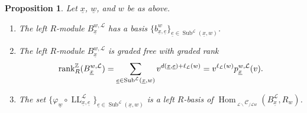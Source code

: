 \documentclass{amsart}
\newcommand{\Z}{\mathbb{Z}}
\newcommand{\scrL}{\mathcal{L}}
\DeclareMathOperator{\Hom}{Hom}
\DeclareMathOperator{\LL}{LL}
\newcommand{\Cmon}[2]{\:_{#1 \backslash} \mathcal{C}_{/ #2} }
\DeclareMathOperator{\Subexp}{Sub}
\newcommand{\ue}{\underline{e}}
\newcommand{\uw}{\underline{w}}
\newcommand{\ux}{\underline{x}}
\newcommand{\grk}{\textnormal{rank}^{\Z}}
\newtheorem{proposition}[subsubsection]{Proposition}
\theoremstyle{definition}
\numberwithin{equation}{subsection}
\begin{document}
\begin{proposition}\label{prop:basis_for_S_uw_x}
    Let $\ux$, $\uw$, and $w$ be as above.
    \begin{enumerate}
        \item The left $R$-module $B_{\ux}^{w, \scrL}$ has a basis $\{ b_{\ux, \ue}^w\}_{\ue \in \Subexp^{\scrL} (\ux, w)}$.
        \item The left $R$-module $B_{\ux}^{w, \scrL}$ is graded free with graded rank 
        \[\grk_R (B_{\ux}^{w, \scrL}) = \sum_{\ue \in \Subexp^{\scrL} (\ux, w)} v^{d(\ux, \ue) + \ell_{\scrL} (w)} = v^{\ell_{\scrL} (w) } p_{\ux}^{w, \scrL} (v). \]
        \item The set $\{ \varphi_{\uw} \circ \LL_{\ux,\ue}^{\scrL} \}_{\ue \in \Subexp^{\scrL} (\ux, w)}$ is a left $R$-basis of $\Hom_{\Cmon{\scrL}{\scrL w}} (B_{\ux}^{\scrL}, R_w)$.
    \end{enumerate}
\end{proposition}
\end{document}
